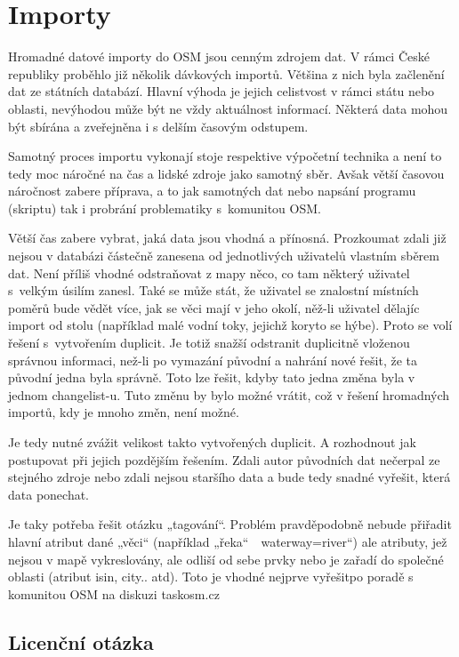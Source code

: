\chapter{Importy}%
\label{2-importy}

Hromadné datové importy do OSM jsou cenným zdrojem dat. V rámci České 
republiky proběhlo již několik dávkových importů. Většina z nich byla 
začlenění dat ze státních databází. Hlavní výhoda je jejich celistvost 
v rámci státu nebo oblasti, nevýhodou může být ne vždy aktuálnost 
informací. Některá data mohou být sbírána a zveřejněna i s delším 
časovým odstupem.   

Samotný proces importu vykonají stoje respektive výpočetní technika a 
není to tedy moc náročné na čas a lidské zdroje jako samotný sběr. 
Avšak větší časovou náročnost zabere příprava, a to jak samotných dat 
nebo napsání programu (skriptu) tak i probrání problematiky s~komunitou OSM. 

Větší čas zabere vybrat, jaká data jsou vhodná a přínosná. Prozkoumat 
zdali již nejsou v databázi částečně zanesena od jednotlivých 
uživatelů vlastním sběrem dat. Není příliš vhodné odstraňovat z mapy 
něco, co tam některý uživatel s~velkým úsilím zanesl. Také se může 
stát, že uživatel se znalostní místních poměrů bude vědět více, jak se 
věci mají v jeho okolí, něž-­li uživatel dělajíc import od stolu 
(například malé vodní toky, jejichž koryto se hýbe). Proto se volí 
řešení s~vytvořením duplicit. Je totiž snažší odstranit duplicitně 
vloženou správnou informaci, než-li po vymazání původní a nahrání nové 
řešit, že ta původní jedna byla správně. Toto lze řešit, kdyby tato 
jedna změna byla v jednom changelist­-u. Tuto změnu by bylo možné 
vrátit, což v řešení hromadných importů, kdy je mnoho změn, není 
možné.

Je tedy nutné zvážit velikost takto vytvořených duplicit. A rozhodnout 
jak postupovat při jejich pozdějším řešením. Zdali autor původních dat 
nečerpal ze stejného zdroje nebo zdali nejsou staršího data a bude 
tedy snadné vyřešit, která data ponechat. 

Je taky potřeba řešit otázku „tagování“. Problém pravděpodobně nebude 
přiřadit hlavní atribut dané „věci“ (například 
„řeka“~~waterway=river“) ale atributy, jež nejsou v mapě 
vykreslovány, ale odliší od sebe prvky nebo je zařadí do společné 
oblasti (atribut is\-in, city.. atd). Toto je vhodné nejprve vyřešitpo 
poradě s komunitou OSM na diskuzi task­osm.cz

\section{Licenční otázka}
\label{2-Importy}

